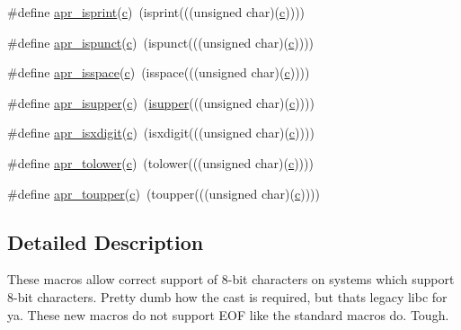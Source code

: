 \begin{DoxyCompactItemize}
\item 
\#define \hyperlink{group__apr__ctype_ga20da56fc8bbedc9f8a40d20c1cc58bac}{apr\+\_\+isprint}(\hyperlink{pcregrep_8txt_aef720ae5f62fa015619d00171d917416}{c})~(isprint(((unsigned char)(\hyperlink{pcregrep_8txt_aef720ae5f62fa015619d00171d917416}{c}))))
\item 
\#define \hyperlink{group__apr__ctype_ga1db14e8d5f9891010c8bad08aa100674}{apr\+\_\+ispunct}(\hyperlink{pcregrep_8txt_aef720ae5f62fa015619d00171d917416}{c})~(ispunct(((unsigned char)(\hyperlink{pcregrep_8txt_aef720ae5f62fa015619d00171d917416}{c}))))
\item 
\#define \hyperlink{group__apr__ctype_ga23f4c7721923a0f0f444fd7fb196047a}{apr\+\_\+isspace}(\hyperlink{pcregrep_8txt_aef720ae5f62fa015619d00171d917416}{c})~(isspace(((unsigned char)(\hyperlink{pcregrep_8txt_aef720ae5f62fa015619d00171d917416}{c}))))
\item 
\#define \hyperlink{group__apr__ctype_ga362f53cc44aab662aaf04fa87e36035b}{apr\+\_\+isupper}(\hyperlink{pcregrep_8txt_aef720ae5f62fa015619d00171d917416}{c})~(\hyperlink{README_8txt_a1cdfcfba9c94d5bdf211d83eafbc618a}{isupper}(((unsigned char)(\hyperlink{pcregrep_8txt_aef720ae5f62fa015619d00171d917416}{c}))))
\item 
\#define \hyperlink{group__apr__ctype_ga9d30f3c5d538c21c6d50565cda8654d0}{apr\+\_\+isxdigit}(\hyperlink{pcregrep_8txt_aef720ae5f62fa015619d00171d917416}{c})~(isxdigit(((unsigned char)(\hyperlink{pcregrep_8txt_aef720ae5f62fa015619d00171d917416}{c}))))
\item 
\#define \hyperlink{group__apr__ctype_gaa591f2a7eb578b1fb3ae9aeaab9eafaa}{apr\+\_\+tolower}(\hyperlink{pcregrep_8txt_aef720ae5f62fa015619d00171d917416}{c})~(tolower(((unsigned char)(\hyperlink{pcregrep_8txt_aef720ae5f62fa015619d00171d917416}{c}))))
\item 
\#define \hyperlink{group__apr__ctype_ga83d2a3217282784d24897658ad0717b7}{apr\+\_\+toupper}(\hyperlink{pcregrep_8txt_aef720ae5f62fa015619d00171d917416}{c})~(toupper(((unsigned char)(\hyperlink{pcregrep_8txt_aef720ae5f62fa015619d00171d917416}{c}))))
\end{DoxyCompactItemize}


\subsection{Detailed Description}
These macros allow correct support of 8-\/bit characters on systems which support 8-\/bit characters. Pretty dumb how the cast is required, but that\textquotesingle{}s legacy libc for ya. These new macros do not support E\+OF like the standard macros do. Tough. 

